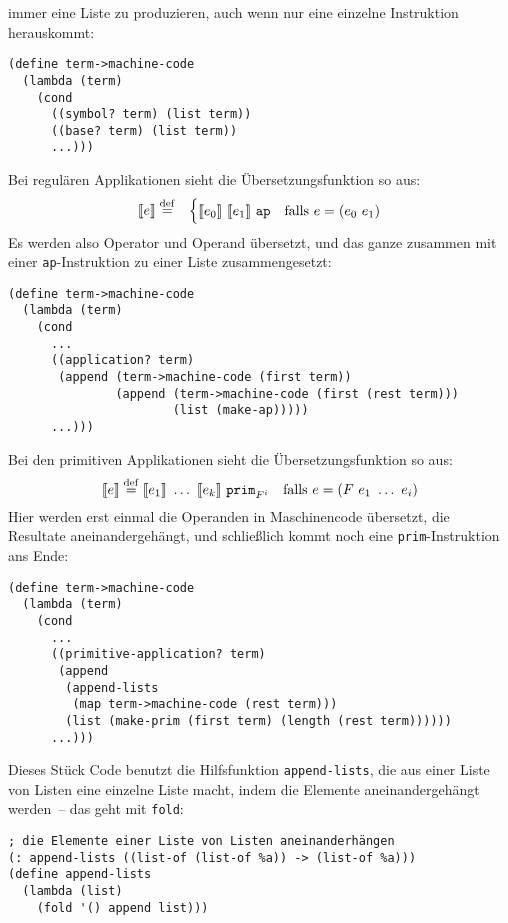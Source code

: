immer eine Liste zu produzieren, auch wenn nur eine einzelne
Instruktion herauskommt:
%
\begin{lstlisting}
(define term->machine-code
  (lambda (term)
    (cond
      ((symbol? term) (list term))
      ((base? term) (list term))
      ...)))
\end{lstlisting}
%
Bei regulären Applikationen sieht die Übersetzungsfunktion so aus:
%
\begin{eqnarray*}
  \llbracket e \rrbracket &\stackrel{\rm def}{=}&
  \begin{cases}
    \llbracket e_0\rrbracket~\llbracket e_1\rrbracket~\mathtt{ap}
    & \textrm{falls $e = (e_0~e_1)$}\\
  \end{cases}
\end{eqnarray*}
%
Es werden also Operator und Operand übersetzt, und das ganze zusammen
mit einer \lstinline{ap}-Instruktion zu einer Liste zusammengesetzt:
%
\begin{lstlisting}
(define term->machine-code
  (lambda (term)
    (cond
      ...
      ((application? term)
       (append (term->machine-code (first term))
               (append (term->machine-code (first (rest term)))
                       (list (make-ap)))))
      ...)))
\end{lstlisting}
%
Bei den primitiven Applikationen sieht die Übersetzungsfunktion so
aus:
%
\begin{displaymath}
  \llbracket e \rrbracket \stackrel{\rm def}{=}
    \llbracket e_1\rrbracket~\ldots~\llbracket e_k\rrbracket~\mathtt{prim}_{F^i}
     \quad\textrm{falls $e = (F~e_1~\ldots~e_i)$}
\end{displaymath}
%
Hier werden erst einmal die Operanden in Maschinencode übersetzt, die
Resultate aneinandergehängt, und schließlich kommt noch eine
\lstinline{prim}-Instruktion ans Ende:
%
\begin{lstlisting}
(define term->machine-code
  (lambda (term)
    (cond
      ...
      ((primitive-application? term)
       (append
        (append-lists
         (map term->machine-code (rest term)))
        (list (make-prim (first term) (length (rest term))))))
      ...)))
\end{lstlisting}
%
Dieses Stück Code benutzt die Hilfsfunktion \lstinline{append-lists}, die
aus einer Liste von Listen eine einzelne Liste macht, indem die
Elemente aneinandergehängt werden~-- das geht mit \lstinline{fold}:
%
\begin{lstlisting}
; die Elemente einer Liste von Listen aneinanderhängen
(: append-lists ((list-of (list-of %a)) -> (list-of %a)))
(define append-lists
  (lambda (list)
    (fold '() append list)))
\end{lstlisting}
